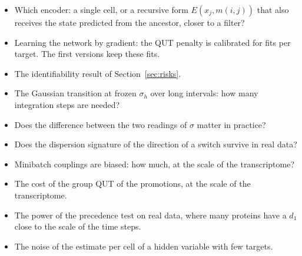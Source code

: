 \documentclass[a4paper, 11pt]{article}
\theoremstyle{plain}
\theoremstyle{remark}
\begin{document}
\begin{itemize}[nosep]
\item Which encoder: a single cell, or a recursive form $E(x_j, m(i,j))$ that also receives the state predicted from the ancestor, closer to a filter?
\item Learning the network by gradient: the QUT penalty is calibrated for fits per target. The first versions keep these fits.
\item The identifiability result of Section~\ref{sec:risks}.
\item The Gaussian transition at frozen $\sigma_h$ over long intervals: how many integration steps are needed?
\item Does the difference between the two readings of $\sigma$ matter in practice?
\item Does the dispersion signature of the direction of a switch survive in real data?
\item Minibatch couplings are biased: how much, at the scale of the transcriptome?
\item The cost of the group QUT of the promotions, at the scale of the transcriptome.
\item The power of the precedence test on real data, where many proteins have a $d_1$ close to the scale of the time steps.
\item The noise of the estimate per cell of a hidden variable with few targets.
\end{itemize}
\end{document}
